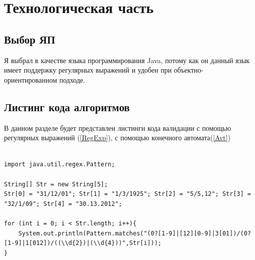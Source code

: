 \documentclass[12pt]{report}
\begin{document}
\chapter{Технологическая часть}
\section{Выбор ЯП}
Я выбрал в качестве языка программирования Java, потому как он данный язык имеет поддержку регулярных выражений и удобен при объектно-ориентированном подходе.

\section{Листинг кода алгоритмов}
В данном разделе будет представлен листинги кода валидации с помощью регулярных выражений (\ref{RegExp}), с помощью конечного автомата(\ref{Avt})
\begin{lstlisting}[label=RegExp,caption = Использование регулярных выражений]

import java.util.regex.Pattern;

String[] Str = new String[5];
Str[0] = "31/12/01"; Str[1] = "1/3/1925"; Str[2] = "5/5,12"; Str[3] = "32/1/09"; Str[4] = "30.13.2012";

for (int i = 0; i < Str.length; i++){
    System.out.println(Pattern.matches("(0?[1-9]|[12][0-9]|3[01])/(0?[1-9]|1[012])/((\\d{2})|(\\d{4}))",Str[i]));
}

\end{lstlisting}
\end{document}
